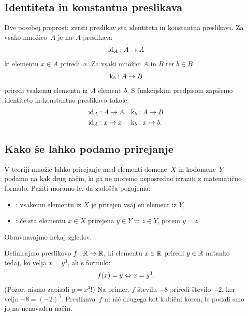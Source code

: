 \subsection{Identiteta in konstantna preslikava}
\label{sec:ident-konst-presl}

Dve posebej preprosti zvrsti preslikav sta identiteta in konstantna preslikava.
Za vsako množico~$A$ je  na~$A$ preslikava
%
\begin{equation*}
  \id[A] : A \to A
\end{equation*}
%
ki elementu $x \in A$ priredi~$x$.
%
Za vsaki množici $A$ in $B$ ter $b \in B$ 
%
\begin{equation*}
  \konst{b} : A \to B
\end{equation*}
%
priredi vsakemu elementu iz~$A$ element~$b$.
%
S funkcijskim predpisom zapišemo identiteto in konstantno preslikavo takole:
%
\begin{align*}
  \id[A] &: A \to A
  &
  \konst{b} &: A \to B
  \\
  \id[A] &: x \mapsto x
  &
  \konst{b} &: x \mapsto b.
\end{align*}

\subsection{Kako še lahko podamo prirejanje}
\label{sec:drugi-nacin-prirejanje}

V teoriji množic lahko prirejanje med elementi domene~$X$ in kodomene~$Y$ podamo na kak drug način, ki ga ne moremo neposredno izraziti z matematično formulo. Paziti moramo le, da zadošča pogojema:
%
\begin{itemize}
\item {}: vsakemu elementu iz $X$ je prirejen vsaj en element iz $Y$,
\item {}: če sta elementu $x \in X$ prirejena $y \in Y$ in $z \in Y$, potem $y = z$.
\end{itemize}
%
Obravnavajmo nekaj zgledov.

\begin{zgled}
  Definirajmo preslikavo $f : \RR \to \RR$, ki elementu $x \in \RR$ priredi $y \in \RR$ natanko tedaj,
  ko velja $x = y^3$, ali s formulo:
  \begin{equation*}
    f(x) = y \liff x = y^3.
  \end{equation*}
  (Pozor, nismo zapisali $y = x^3$!) Na primer, $f$ številu $-8$ priredi število $-2$, ker velja
  $-8 = (-2)^3$. Preslikava~$f$ ni nič drugega kot kubični koren, le podali smo jo na nenavaden način.
\end{zgled}

